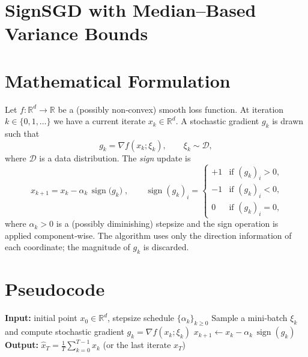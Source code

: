 \documentclass[11pt]{article}
\newcommand{\sign}{\operatorname{sign}}
\newcommand{\R}{\mathbb{R}}
\begin{document}
\section*{SignSGD with Median–Based Variance Bounds}

\section*{Mathematical Formulation}
Let $f:\R^{d}\rightarrow\R$ be a (possibly non‑convex) smooth loss function.  
At iteration $k\in\{0,1,\dots\}$ we have a current iterate $x_k\in\R^{d}$.  
A stochastic gradient $g_k$ is drawn such that
\[
g_k = \nabla f(x_k;\xi_k),\qquad \xi_k\sim\mathcal{D},
\]
where $\mathcal{D}$ is a data distribution.  
The \emph{sign} update is
\begin{equation}
\boxed{\;x_{k+1}=x_k-\alpha_k\,\sign\!\bigl(g_k\bigr)\;},
\qquad 
\sign(g_k)_i=\begin{cases}
+1 & \text{if }(g_k)_i>0,\\[2mm]
-1 & \text{if }(g_k)_i<0,\\[2mm]
0  & \text{if }(g_k)_i=0,
\end{cases}
\label{eq:update}
\end{equation}
where $\alpha_k>0$ is a (possibly diminishing) stepsize and the sign operation is applied component‑wise.  
The algorithm uses only the direction information of each coordinate; the magnitude of $g_k$ is discarded.

\section*{Pseudocode}
\begin{algorithm}[H]
\caption{SignSGD with Median Variance Bounds}
\begin{algorithmic}[1]
\State \textbf{Input:} initial point $x_0\in\R^{d}$, stepsize schedule $\{\alpha_k\}_{k\ge0}$
    \State Sample a mini‑batch $\xi_k$ and compute stochastic gradient $g_k=\nabla f(x_k;\xi_k)$
    \State $x_{k+1}\gets x_k-\alpha_k\,\sign(g_k)$
\EndFor
\State \textbf{Output:} $\displaystyle \hat{x}_T=\frac1T\sum_{k=0}^{T-1}x_k$ (or the last iterate $x_T$)
\end{algorithmic}
\end{algorithm}
\end{document}
